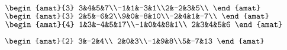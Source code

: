 \begin{Answer}
\Question 
$
\begin{amat}{3}
3&4&5&7\\-1&1&-3&1\\2&-2&3&5\\
\end{amat}
$
\Question 
$
\begin{amat}{3}
2&5&-6&2\\9&0&-8&10\\-2&4&1&-7\\
\end{amat}
$
\Question
$
\begin{amat}{4}
1&3&-4&5&17\\-1&0&4&8&1\\ 2&3&4&5&6
\end{amat}
$

\Question
$
\begin{amat}{2}
3&-2&4\\ 2&0&3\\-1&9&8\\5&-7&13
\end{amat}
$
\end{Answer}
